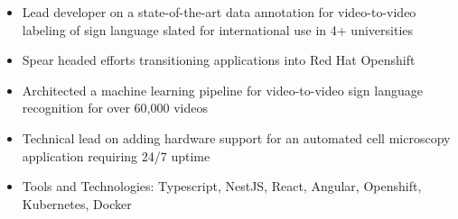 \begin{itemize}
    \setlength\itemsep{0pt}
    \setlength{\parskip}{0pt}
    \item Lead developer on a state-of-the-art data annotation for video-to-video labeling of sign language slated for international use in 4+ universities
    \item Spear headed efforts transitioning applications into Red Hat Openshift
    \item Architected a machine learning pipeline for video-to-video sign language recognition for over 60,000 videos
    \item Technical lead on adding hardware support for an automated cell microscopy application requiring 24/7 uptime
    \item Tools and Technologies: Typescript, NestJS, React, Angular, Openshift, Kubernetes, Docker
\end{itemize}
